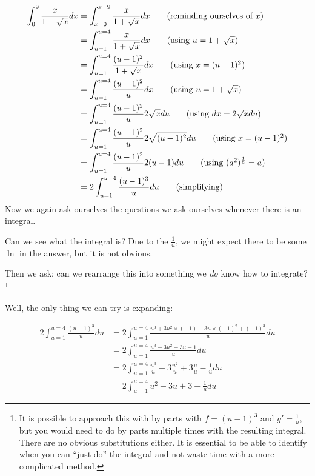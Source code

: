 \begin{solution}
    \begin{align*}
        \int_{0}^{9}\frac{x}{1 + \sqrt{x}}dx &= \int_{x=0}^{x=9}\frac{x}{1 + \sqrt{x}}dx \tag{reminding ourselves of $x$} \\
         &= \int_{u=1}^{u=4}\frac{x}{1 + \sqrt{x}}dx \tag{using $u = 1 + \sqrt{x}$} \\
         &= \int_{u=1}^{u=4}\frac{(u-1)^2}{1 + \sqrt{x}}dx \tag{using $x = (u-1)^2$} \\
         &= \int_{u=1}^{u=4}\frac{(u-1)^2}{u}dx \tag{using $u = 1 + \sqrt{x}$} \\
         &= \int_{u=1}^{u=4}\frac{(u-1)^2}{u}2\sqrt{x}du \tag{using $dx = 2\sqrt{x}du$} \\
         &= \int_{u=1}^{u=4}\frac{(u-1)^2}{u}2\sqrt{(u-1)^2}du \tag{using $x = (u-1)^2$} \\
         &= \int_{u=1}^{u=4}\frac{(u-1)^2}{u}2(u-1)du \tag{using $(a^2)^\frac{1}{2} = a$} \\
         &= 2\int_{u=1}^{u=4}\frac{(u-1)^3}{u}du \tag{simplifying} \\
    \end{align*}
    Now we again ask ourselves the questions we ask ourselves whenever there is an integral.

    Can we see what the integral is? Due to the $\frac{1}{u}$, we might expect there to be some $\ln$ in the answer, but it is not obvious.

    Then we ask: can we rearrange this into something we \emph{do} know how to integrate?\footnote{It is possible to approach this with by parts with $f=(u-1)^3$ and $g' = \frac{1}{u}$, but you would need to do by parts multiple times with the resulting integral. There are no obvious substitutions either. It is essential to be able to identify when you can ``just do'' the integral and not waste time with a more complicated method.}

    Well, the only thing we can try is expanding:

    \begin{align*}
        2\int_{u=1}^{u=4}\frac{(u-1)^3}{u}du &= 2\int_{u=1}^{u=4}\frac{u^3 + 3u^2\times(-1) + 3u\times(-1)^2 + (-1)^3}{u}du \tag{using binomial expansion formula} \\
         &=  2\int_{u=1}^{u=4}\frac{u^3 - 3u^2 + 3u -1}{u}du \tag{simplifying} \\
         &= 2\int_{u=1}^{u=4}\frac{u^3}{u}- 3 \frac{u^2}{u} + 3\frac{u}{u} - \frac{1}{u} du \tag{separating the fraction} \\
         &= 2 \int_{u=1}^{u=4}u^2- 3 u + 3 - \frac{1}{u} du \tag{simplifying}
    \end{align*}


\end{solution}
